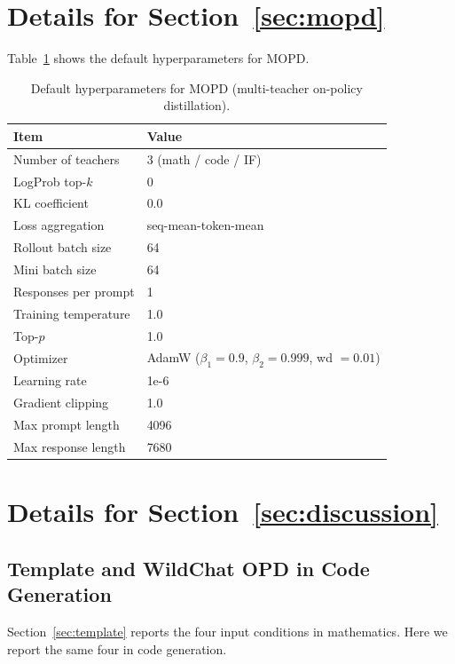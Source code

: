 \section{Details for Section~\ref{sec:mopd}}
Table~\ref{tab:mopd-hyperparams} shows the default hyperparameters for MOPD.

\begin{table}[!ht]
\centering
\caption{Default hyperparameters for MOPD (multi-teacher on-policy distillation).}
\label{tab:mopd-hyperparams}
\small
\begin{tabular}{ll}
\toprule
\textbf{Item} & \textbf{Value} \\
\midrule
Number of teachers      & 3 (math / code / IF) \\
LogProb top-$k$         & 0  \\
KL coefficient          & 0.0 \\
Loss aggregation        & seq-mean-token-mean \\
\midrule
Rollout batch size      & 64 \\
Mini batch size         & 64 \\
Responses per prompt    & 1 \\
Training temperature    & 1.0 \\
Top-$p$                 & 1.0 \\
\midrule
Optimizer               & AdamW ($\beta_1{=}0.9$, $\beta_2{=}0.999$, wd $=0.01$) \\
Learning rate           & 1e-6 \\
Gradient clipping       & 1.0 \\
\midrule
Max prompt length       & 4096 \\
Max response length     & 7680 \\
\bottomrule
\end{tabular}
\end{table}


\section{Details for Section~\ref{sec:discussion}}

\subsection{Template and WildChat OPD in Code Generation}
\label{app:template-code}

Section~\ref{sec:template} reports the four input conditions in mathematics. Here we report the same four in code generation.


